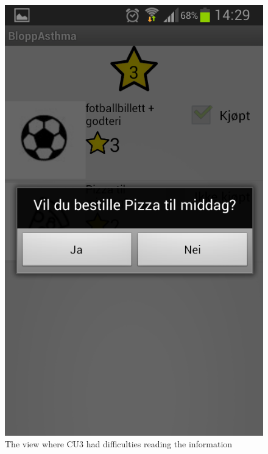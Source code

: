 \begin{figure}[H]
	\centering
	\includegraphics[width=0.25\paperwidth]{Pictures/app-screenshots/asthmapp-buy-screen.png}
	\caption{The view where CU3 had difficulties reading the information}
	\label{fig:asthmapp-purchase}
\end{figure}

